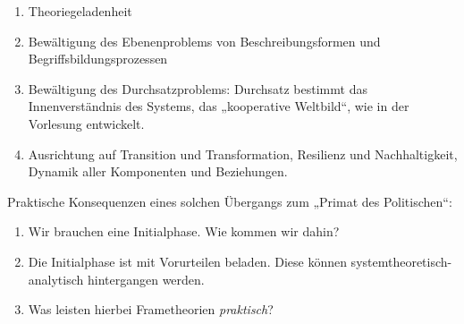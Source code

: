 \documentclass[11pt,a4paper]{article}
\begin{document}
\begin{enumerate}[noitemsep]
\item Theoriegeladenheit
\item Bewältigung des Ebenenproblems von Beschreibungsformen und
  Begriffsbildungsprozessen
\item Bewältigung des Durchsatzproblems: Durchsatz bestimmt das
  Innenverständnis des Systems, das „kooperative Weltbild“, wie in der
  Vorlesung entwickelt.
\item Ausrichtung auf Transition und Transformation, Resilienz und
  Nachhaltigkeit, Dynamik aller Komponenten und Beziehungen.
\end{enumerate}

Praktische Konsequenzen eines solchen Übergangs zum „Primat des Politischen“:
\begin{enumerate}[noitemsep]
\item Wir brauchen eine Initialphase. Wie kommen wir dahin?
\item Die Initialphase ist mit Vorurteilen beladen. Diese können
  systemtheoretisch-analytisch hintergangen werden.
\item Was leisten hierbei Frametheorien \emph{praktisch}?
\end{enumerate}
\end{document}
